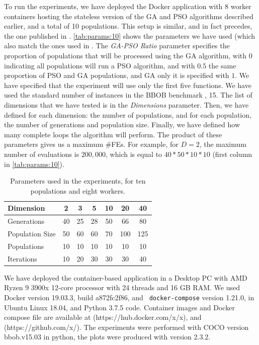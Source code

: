 \documentclass[runningheads]{llncs}
\begin{document}
To run the experiments, we have deployed the Docker application with 8 worker
containers hosting the stateless version of the GA and PSO algorithms described
earlier, and a total of 10 populations. This setup is similar, and in
fact precedes, the one published in \cite{GARCIAVALDEZ2021234:anon}.
\autoref{tab:params:10} shows the parameters we have used (which
also match the ones used in \cite{GARCIAVALDEZ2021234:anon}. The {\em
GA-PSO Ratio} parameter specifies the proportion of populations that
will be processed using the GA algorithm, with $0$ indicating all
populations will run a PSO algorithm, and with $0.5$ the same
proportion of PSO and GA populations, and GA only it is specified with
$1$. We have specified that the experiment will use only the first
five functions. We have used the
standard number of instances in the BBOB benchmark
\cite{hansen2016coco}, 15. The list of
dimensions that we have tested is in the {\em Dimensions} parameter.
Then, we have defined for each dimension: the number of populations,
and for each population, the number of generations and population
size. Finally, we have defined how many complete loops the algorithm
will perform. The product of these parameters gives us a maximum
\#FEs. For example, for $D = 2$, the maximum number of evaluations is
$200,000$, which is equal to $40*50*10*10$ (first column in \autoref{tab:params:10}).

\begin{table}[h!tb]
  \small
  \caption{Parameters used in the experiments, for ten populations and eight workers.
  }
  \label{tab:params:10}
  \vspace{0.25cm}
  \centering
  \small
  \begin{tabular}{|l|c|c|c|c|c|c|}
    \hline
    Dimension        & 2  & 3  & 5  & 10 & 20  & 40  \\ \hline
    Generations      & 40 & 25 & 28 & 50 & 66  & 80  \\ \hline
    Population Size  & 50 & 60 & 60 & 70 & 100 & 125 \\ \hline
    Populations      & 10 & 10 & 10 & 10 & 10  & 10  \\ \hline
    Iterations       & 10 & 20 & 30 & 30 & 30  & 40  \\ \hline
  \end{tabular}
\end{table}

We have deployed the container-based application in a Desktop PC with
AMD Ryzen 9 3900x 12-core processor with 24 threads and 16 GB RAM. We
used Docker version 19.03.3, build a872fc2f86, and {\tt
docker-compose} version 1.21.0, in Ubuntu Linux 18.04, and Python
3.7.5 code. Container images and Docker compose file are available at
(https://hub.docker.com/x/x), and (https://github.com/x/).  The
experiments were performed with COCO \cite{hansen2016coco} version
bbob.v15.03 in python, the plots were produced with version 2.3.2.
\end{document}
